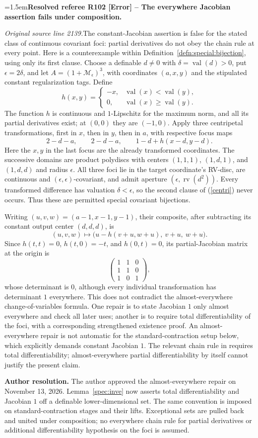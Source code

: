 \documentclass[12pt]{amsart}
\newcommand{\ResolvedRefereeRemark}[5]{%
  \par\medskip\begingroup\normalfont\small\color{gray}%
  \emergencystretch=1.5em\noindent\textbf{Resolved referee R#1 [#2] -- #3.}\par\nobreak\noindent #4\par
  \medskip\color{ResolutionGreen}\noindent\textbf{Author resolution.} #5\par
  \endgroup\medskip
}
\theoremstyle{plain}
\theoremstyle{definition}
\theoremstyle{remark}
\numberwithin{equation}{section}
\theoremstyle{plain}
\newcommand{\MM}{\mdl M}
\newcommand{\0}{\emptyset}
\newcommand{\mdl}[1]{\mathcal{#1}}  %
\DeclareMathOperator{\rv}{rv}
\DeclareMathOperator{\vv}{val}
\begin{document}
\ResolvedRefereeRemark{102}{Error}{The everywhere Jacobian assertion fails under composition}{%
\textit{Original source line 2139.}\quad The constant-Jacobian assertion is false for the stated class of continuous covariant foci: partial derivatives do not obey the chain rule at every point. Here is a counterexample within Definition~\ref{defn:special:bijection}, using only its first clause. Choose a definable $d\ne0$ with $\delta=\vv(d)>0$, put $\epsilon=2\delta$, and let $A=(1+\MM_\epsilon)^3$, with coordinates $(a,x,y)$ and the stipulated constant regularization tags. Define
\[
h(x,y)=\begin{cases}-x,&\vv(x)<\vv(y),\\0,&\vv(x)\geq\vv(y).\end{cases}
\]
The function $h$ is continuous and $1$-Lipschitz for the maximum norm, and all its partial derivatives exist; at $(0,0)$ they are $(-1,0)$. Apply three centripetal transformations, first in $x$, then in $y$, then in $a$, with respective focus maps
\[
2-d-a,\qquad 2-d-a,\qquad 1-d+h(x-d,y-d).
\]
Here the $x,y$ in the last focus are the already transformed coordinates. The successive domains are product polydiscs with centers $(1,1,1)$, $(1,d,1)$, and $(1,d,d)$ and radius $\epsilon$. All three foci lie in the target coordinate's RV-disc, are continuous and $(\epsilon,\epsilon)$-covariant, and admit aperture $(\epsilon,\rv(d^2))$. Every transformed difference has valuation $\delta<\epsilon$, so the second clause of (\ref{centri}) never occurs. Thus these are permitted special covariant bijections.

Writing $(u,v,w)=(a-1,x-1,y-1)$, their composite, after subtracting its constant output center $(d,d,d)$, is
\[
(u,v,w)\longmapsto
\bigl(u-h(v+u,w+u),\ v+u,\ w+u\bigr).
\]
Since $h(t,t)=0$, $h(t,0)=-t$, and $h(0,t)=0$, its partial-Jacobian matrix at the origin is
\[
\begin{pmatrix}1&1&0\\1&1&0\\1&0&1\end{pmatrix},
\]
whose determinant is $0$, although every individual transformation has determinant $1$ everywhere. This does not contradict the almost-everywhere change-of-variables formula. One repair is to state Jacobian $1$ only almost everywhere and check all later uses; another is to require total differentiability of the foci, with a corresponding strengthened existence proof. An almost-everywhere repair is not automatic for the standard-contraction setup below, which explicitly demands constant Jacobian $1$. The relevant chain rule in \cite[Lemma~9.7]{Yin:special:trans} requires total differentiability; almost-everywhere partial differentiability by itself cannot justify the present claim.
}{The author approved the almost-everywhere repair on November 13, 2026. Lemma~\ref{spec:inve} now asserts total differentiability and Jacobian $1$ off a definable lower-dimensional set. The same convention is imposed on standard-contraction stages and their lifts. Exceptional sets are pulled back and united under composition; no everywhere chain rule for partial derivatives or additional differentiability hypothesis on the foci is assumed.}
\end{document}
